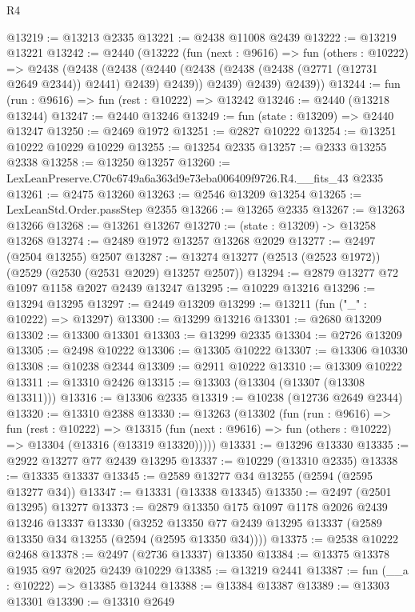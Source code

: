 \begin{lexlean}{R4}
\begin{coremodule}
@13219 := @13213 @2335
@13221 := @2438 @11008 @2439
@13222 := @13219 @13221
@13242 := @2440
    (@13222
      (fun (next : @9616) =>
      fun (others : @10222) =>
      @2438
        (@2438
          (@2438
            (@2440 (@2438 (@2438 (@2438 (@2771 (@12731 @2649 @2344)) @2441) @2439) @2439))
            @2439)
          @2439)
        @2439))
@13244 := fun (run : @9616) => fun (rest : @10222) => @13242
@13246 := @2440 (@13218 @13244)
@13247 := @2440 @13246
@13249 := fun (state : @13209) => @2440 @13247
@13250 := @2469 @1972
@13251 := @2827 @10222
@13254 := @13251 @10222 @10229 @10229
@13255 := @13254 @2335
@13257 := @2333 @13255 @2338
@13258 := @13250 @13257
@13260 := LexLeanPreserve.C70c6749a6a363d9e73eba006409f9726.R4.__fits_43 @2335
@13261 := @2475 @13260
@13263 := @2546 @13209 @13254
@13265 := LexLeanStd.Order.passStep @2355
@13266 := @13265 @2335
@13267 := @13263 @13266
@13268 := @13261 @13267
@13270 := (state : @13209) -> @13258 @13268
@13274 := @2489 @1972 @13257 @13268 @2029
@13277 := @2497 (@2504 @13255) @2507
@13287 := @13274 @13277 (@2513 (@2523 @1972)) (@2529 (@2530 (@2531 @2029) @13257 @2507))
@13294 := @2879 @13277 @72 @1097 @1158 @2027 @2439 @13247
@13295 := @10229 @13216
@13296 := @13294 @13295
@13297 := @2449 @13209
@13299 := @13211 (fun ("_" : @10222) => @13297)
@13300 := @13299 @13216
@13301 := @2680 @13209
@13302 := @13300 @13301
@13303 := @13299 @2335
@13304 := @2726 @13209
@13305 := @2498 @10222
@13306 := @13305 @10222
@13307 := @13306 @10330
@13308 := @10238 @2344
@13309 := @2911 @10222
@13310 := @13309 @10222
@13311 := @13310 @2426
@13315 := @13303 (@13304 (@13307 (@13308 @13311)))
@13316 := @13306 @2335
@13319 := @10238 (@12736 @2649 @2344)
@13320 := @13310 @2388
@13330 := @13263
    (@13302
      (fun (run : @9616) =>
      fun (rest : @10222) =>
      @13315 (fun (next : @9616) => fun (others : @10222) => @13304 (@13316 (@13319 @13320)))))
@13331 := @13296 @13330
@13335 := @2922 @13277 @77 @2439 @13295
@13337 := @10229 (@13310 @2335)
@13338 := @13335 @13337
@13345 := @2589 @13277 @34 @13255 (@2594 (@2595 @13277 @34))
@13347 := @13331 (@13338 @13345)
@13350 := @2497 (@2501 @13295) @13277
@13373 := @2879
    @13350
    @175
    @1097
    @1178
    @2026
    @2439
    @13246
    @13337
    @13330
    (@3252 @13350 @77 @2439 @13295 @13337 (@2589 @13350 @34 @13255 (@2594 (@2595 @13350 @34))))
@13375 := @2538 @10222 @2468
@13378 := @2497 (@2736 @13337) @13350
@13384 := @13375 @13378 @1935 @97 @2025 @2439 @10229
@13385 := @13219 @2441
@13387 := fun (__a : @10222) => @13385 @13244
@13388 := @13384 @13387
@13389 := @13303 @13301
@13390 := @13310 @2649

\end{coremodule}
\end{lexlean}
